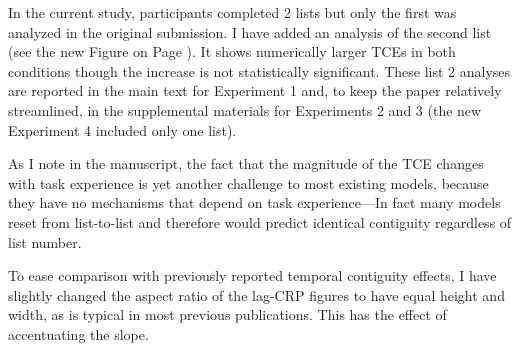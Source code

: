 \documentclass[12pt]{article}
\begin{document}
\begin{enumerate}
	In the current study, participants completed 2 lists but only the first was analyzed in the original submission. I have added an analysis of the second list (see the new Figure on Page \pageref{TODO-6}). It shows numerically larger TCEs in both conditions though the increase is not statistically significant. These list 2 analyses are reported in the main text for Experiment 1 and, to keep the paper relatively streamlined, in the supplemental materials for Experiments 2 and 3 (the new Experiment 4 included only one list).

	As I note in the manuscript, the fact that the magnitude of the TCE changes with task experience is yet another challenge to most existing models, because they have no mechanisms that depend on task experience---In fact many models reset from list-to-list and therefore would predict identical contiguity regardless of list number.

	To ease comparison with previously reported temporal contiguity effects, I have slightly changed the aspect ratio of the lag-CRP figures to have equal height and width, as is typical in most previous publications. This has the effect of accentuating the slope. 



\end{enumerate}
\end{document}
